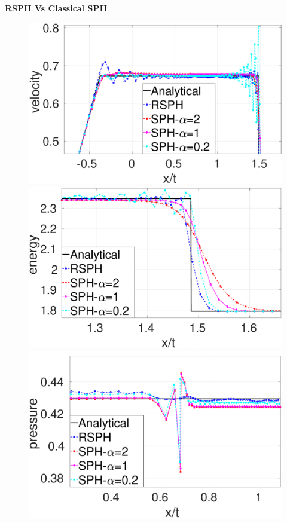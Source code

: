 \documentclass[oneside,11pt]{memoir}
\begin{document}
\begin{vplace}[0.7]
\centering
\textbf{RSPH Vs Classical SPH} 
\begin{figure}[htp]
    \centering
    \begin{minipage}{.33 \textwidth}
        \centering
        \includegraphics[width=0.99 \textwidth]{./Figures/Sod/RCM-Sod-SPH-alf-v-zoom}
    \end{minipage}%
    \begin{minipage}{.33 \textwidth}
        \centering
        \includegraphics[width=0.99 \textwidth]{./Figures/Sod/RCM-Sod-SPH-alf-e-zoom}
    \end{minipage}%
    \begin{minipage}{.33\textwidth}
        \centering
        \includegraphics[width=0.99 \textwidth]{./Figures/Sod/RCM-Sod-SPH-alf-p-zoom}
    \end{minipage}%
\end{figure}


\end{vplace}
\end{document}
